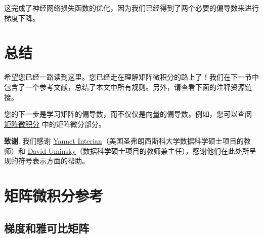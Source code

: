 \documentclass[11pt]{article}
\begin{document}
这完成了神经网络损失函数的优化，因为我们已经得到了两个必要的偏导数来进行梯度下降。


\section{总结}\label{sec7}

希望您已经一路读到这里。您已经走在理解矩阵微积分的路上了！我们在下一节中包含了一个参考文献，总结了本文中所有规则。另外，请查看下面的注释资源链接。

您的下一步是学习矩阵的偏导数，而不仅仅是向量的偏导数。例如，您可以查阅 \href{https://atmos.washington.edu/~dennis/MatrixCalculus.pdf}{矩阵微积分} 中的矩阵微分部分。

{\bf 致谢}. 我们感谢 \href{https://www.usfca.edu/faculty/yannet-interian}{Yannet Interian}（美国圣弗朗西斯科大学数据科学硕士项目的教师）和 \href{http://www.cs.usfca.edu/~duminsky/}{David Uminsky}（数据科学硕士项目的教师兼主任），感谢他们在此处所呈现的符号表示方面的帮助。


\section{矩阵微积分参考}\label{reference}


\subsection{梯度和雅可比矩阵}\label{sec8.1}
\end{document}
